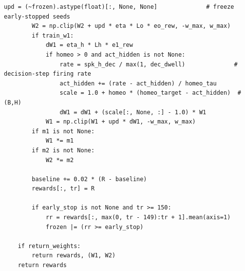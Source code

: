 \begin{lstlisting}[caption={mrl\_trace/deep\_sequential.py},label={lst:siox-src-deep_sequential}]
        upd = (~frozen).astype(float)[:, None, None]              # freeze early-stopped seeds
        W2 = np.clip(W2 + upd * eta * Lo * eo_rew, -w_max, w_max)
        if train_w1:
            dW1 = eta_h * Lh * e1_rew
            if homeo > 0 and act_hidden is not None:
                rate = spk_h_dec / max(1, dec_dwell)              # decision-step firing rate
                act_hidden += (rate - act_hidden) / homeo_tau
                scale = 1.0 + homeo * (homeo_target - act_hidden)  # (B,H)
                dW1 = dW1 + (scale[:, None, :] - 1.0) * W1
            W1 = np.clip(W1 + upd * dW1, -w_max, w_max)
        if m1 is not None:
            W1 *= m1
        if m2 is not None:
            W2 *= m2

        baseline += 0.02 * (R - baseline)
        rewards[:, tr] = R

        if early_stop is not None and tr >= 150:
            rr = rewards[:, max(0, tr - 149):tr + 1].mean(axis=1)
            frozen |= (rr >= early_stop)

    if return_weights:
        return rewards, (W1, W2)
    return rewards
\end{lstlisting}

